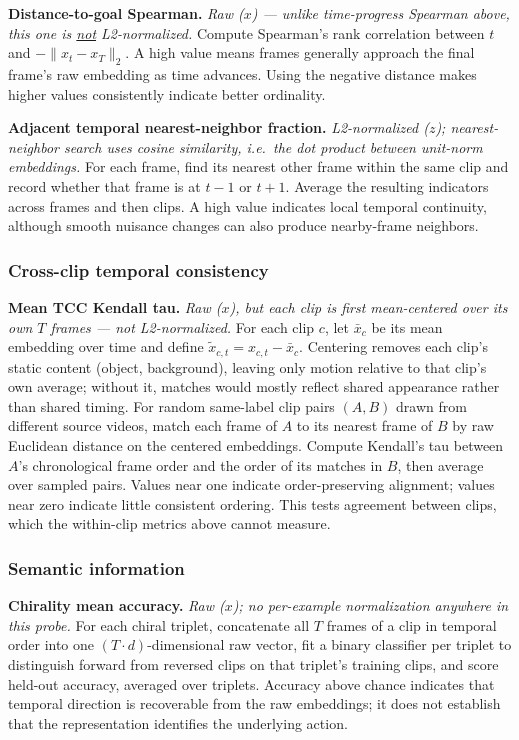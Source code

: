 \noindent\textbf{Distance-to-goal Spearman.} \emph{Raw ($x$) --- unlike time-progress
Spearman above, this one is \underline{not} L2-normalized.} Compute Spearman's rank
correlation between $t$ and $-\|x_t-x_T\|_2$. A high value means frames generally
approach the final frame's raw embedding as time advances. Using the negative distance
makes higher values consistently indicate better ordinality.

\noindent\textbf{Adjacent temporal nearest-neighbor fraction.} \emph{L2-normalized
($z$); nearest-neighbor search uses cosine similarity, i.e.\ the dot product between
unit-norm embeddings.} For each frame, find its nearest other frame within the same clip
and record whether that frame is at $t-1$ or $t+1$. Average the resulting indicators
across frames and then clips. A high value indicates local temporal continuity, although
smooth nuisance changes can also produce nearby-frame neighbors.

\subsubsection{Cross-clip temporal consistency}

\noindent\textbf{Mean TCC Kendall tau.} \emph{Raw ($x$), but each clip is first
mean-centered over its own $T$ frames --- not L2-normalized.} For each clip $c$, let
$\bar{x}_c$ be its mean embedding over time and define $\tilde{x}_{c,t}=x_{c,t}-\bar{x}_c$.
Centering removes each clip's static content (object, background), leaving only motion
relative to that clip's own average; without it, matches would mostly reflect shared
appearance rather than shared timing. For random same-label clip pairs $(A,B)$ drawn
from different source videos, match each frame of $A$ to its nearest frame of $B$ by raw
Euclidean distance on the centered embeddings. Compute Kendall's tau between $A$'s
chronological frame order and the order of its matches in $B$, then average over sampled
pairs. Values near one indicate order-preserving alignment; values near zero indicate
little consistent ordering. This tests agreement between clips, which the within-clip
metrics above cannot measure.

\subsubsection{Semantic information}

\noindent\textbf{Chirality mean accuracy.} \emph{Raw ($x$); no per-example
normalization anywhere in this probe.} For each chiral triplet, concatenate all $T$
frames of a clip in temporal order into one $(T{\cdot}d)$-dimensional raw vector, fit a
binary classifier per triplet to distinguish forward from reversed clips on that
triplet's training clips, and score held-out accuracy, averaged over triplets. Accuracy
above chance indicates that temporal direction is recoverable from the raw embeddings;
it does not establish that the representation identifies the underlying action.


